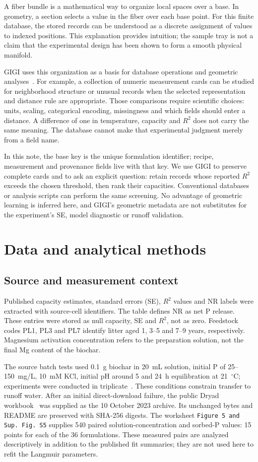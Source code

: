 \documentclass[11pt,letterpaper]{article}
\begin{document}
A fiber bundle is a mathematical way to organize local spaces over a base. In geometry, a section selects a value in the fiber over each base point. For this finite database, the stored records can be understood as a discrete assignment of values to indexed positions. This explanation provides intuition; the sample tray is not a claim that the experimental design has been shown to form a smooth physical manifold.

GIGI uses this organization as a basis for database operations and geometric analyses~\cite{gigi}. For example, a collection of numeric measurement cards can be studied for neighborhood structure or unusual records when the selected representation and distance rule are appropriate. Those comparisons require scientific choices: units, scaling, categorical encoding, missingness and which fields should enter a distance. A difference of one in temperature, capacity and $R^2$ does not carry the same meaning. The database cannot make that experimental judgment merely from a field name.

In this note, the base key is the unique formulation identifier; recipe, measurement and provenance fields live with that key. We use GIGI to preserve complete cards and to ask an explicit question: retain records whose reported $R^2$ exceeds the chosen threshold, then rank their capacities. Conventional databases or analysis scripts can perform the same screening. No advantage of geometric learning is inferred here, and GIGI's geometric metadata are not substitutes for the experiment's SE, model diagnostic or runoff validation.

\section{Data and analytical methods}
\subsection{Source and measurement context}
Published capacity estimates, standard errors (SE), $R^2$ values and NR labels were extracted with source-cell identifiers. The table defines NR as net P release. These entries were stored as null capacity, SE and $R^2$, not as zero. Feedstock codes PL1, PL3 and PL7 identify litter aged 1, 3--5 and 7--9 years, respectively. Magnesium activation concentration refers to the preparation solution, not the final Mg content of the biochar.

The source batch tests used 0.1~g biochar in 20~mL solution, initial P of 25--150~mg/L, 10~mM KCl, initial pH around 5 and 24~h equilibration at 21~$^\circ$C; experiments were conducted in triplicate~\cite{padilla}. These conditions constrain transfer to runoff water. After an initial direct-download failure, the public Dryad workbook~\cite{dryad} was supplied as the 10 October 2023 archive. Its unchanged bytes and README are preserved with SHA-256 digests. The worksheet \texttt{Figure 5 and Sup. Fig. S5} supplies 540 paired solution-concentration and sorbed-P values: 15 points for each of the 36 formulations. These measured pairs are analyzed descriptively in addition to the published fit summaries; they are not used here to refit the Langmuir parameters.
\end{document}
